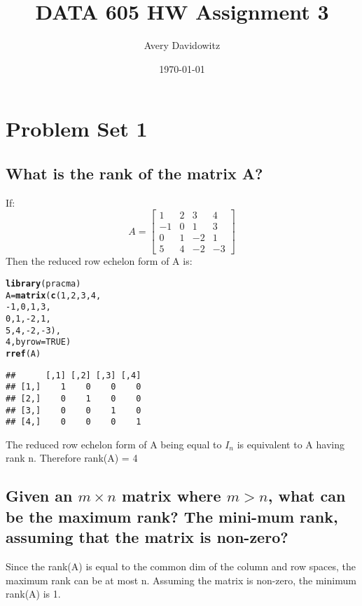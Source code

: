 \documentclass{article}\usepackage[]{graphicx}\usepackage[]{xcolor}
\title {DATA 605 HW Assignment 3}
\author{Avery Davidowitz}
\date{\today}
\makeatletter
\newcommand{\hlnum}[1]{\textcolor[rgb]{0.686,0.059,0.569}{#1}}%
\newcommand{\hlopt}[1]{\textcolor[rgb]{0,0,0}{#1}}%
\newcommand{\hlstd}[1]{\textcolor[rgb]{0.345,0.345,0.345}{#1}}%
\newcommand{\hlkwb}[1]{\textcolor[rgb]{0.69,0.353,0.396}{#1}}%
\newcommand{\hlkwc}[1]{\textcolor[rgb]{0.333,0.667,0.333}{#1}}%
\newcommand{\hlkwd}[1]{\textcolor[rgb]{0.737,0.353,0.396}{\textbf{#1}}}%
\newenvironment{kframe}{%
 \def\at@end@of@kframe{}%
 \ifinner\ifhmode%
  \def\at@end@of@kframe{\end{minipage}}%
  \begin{minipage}{\columnwidth}%
 \fi\fi%
 \def\FrameCommand##1{\hskip\@totalleftmargin \hskip-\fboxsep
 \colorbox{shadecolor}{##1}\hskip-\fboxsep
     \hskip-\linewidth \hskip-\@totalleftmargin \hskip\columnwidth}%
 \MakeFramed {\advance\hsize-\width
   \@totalleftmargin\z@ \linewidth\hsize
   \@setminipage}}%
 {\par\unskip\endMakeFramed%
 \at@end@of@kframe}
\newenvironment{knitrout}{}{} %
\makeatother
\begin{document}
\maketitle
\bigbreak

\section{Problem Set 1}
\subsection{What is the rank of the matrix A?}

If:
\[ A =
\left[ 
\begin{array}{cccc}
1 & 2 & 3 & 4\\
-1 & 0 & 1 & 3\\
0 & 1 & -2 & 1\\
5 & 4 & -2 & -3
\end{array} 
\right] 
\]
Then the reduced row echelon form of A is:
\begin{knitrout}
\color{fgcolor}\begin{kframe}
\begin{alltt}
\hlkwd{library}\hlstd{(pracma)}
\hlstd{A} \hlkwb{=} \hlkwd{matrix}\hlstd{(}\hlkwd{c}\hlstd{(}\hlnum{1}\hlstd{,}\hlnum{2}\hlstd{,}\hlnum{3}\hlstd{,}\hlnum{4}\hlstd{,}
             \hlopt{-}\hlnum{1}\hlstd{,}\hlnum{0}\hlstd{,}\hlnum{1}\hlstd{,}\hlnum{3}\hlstd{,}
             \hlnum{0}\hlstd{,}\hlnum{1}\hlstd{,}\hlopt{-}\hlnum{2}\hlstd{,}\hlnum{1}\hlstd{,}
             \hlnum{5}\hlstd{,}\hlnum{4}\hlstd{,}\hlopt{-}\hlnum{2}\hlstd{,}\hlopt{-}\hlnum{3}\hlstd{),}
             \hlnum{4}\hlstd{,} \hlkwc{byrow}\hlstd{=}\hlnum{TRUE}\hlstd{)}
\hlkwd{rref}\hlstd{(A)}
\end{alltt}
\begin{verbatim}
##      [,1] [,2] [,3] [,4]
## [1,]    1    0    0    0
## [2,]    0    1    0    0
## [3,]    0    0    1    0
## [4,]    0    0    0    1
\end{verbatim}
\end{kframe}
\end{knitrout}
The reduced row echelon form of A being equal to $I_{n}$ is equivalent to A having rank n.
Therefore rank(A) = 4

\subsection{Given an $m \times n$ matrix where $m > n$, what can be the maximum rank? The mini-mum rank, assuming that the matrix is non-zero?}
Since the rank(A) is equal to the common dim of the column and row spaces, the maximum rank can be at most n. Assuming the matrix is non-zero, the minimum rank(A) is 1.
\end{document}
